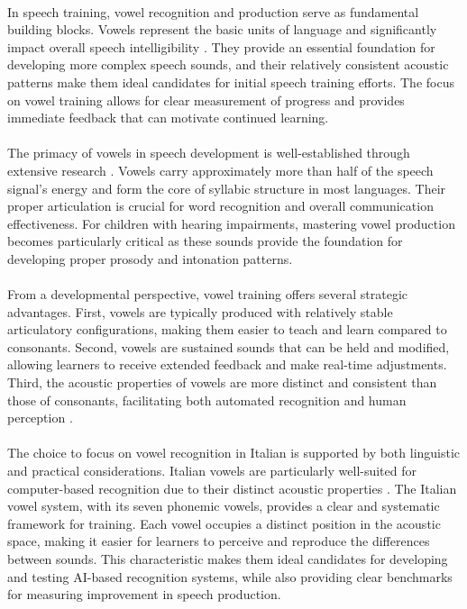 \paragraph{}
In speech training, vowel recognition and production serve as fundamental building blocks. Vowels represent the basic units of language and significantly impact overall speech intelligibility \cite{vowel2020}. They provide an essential foundation for developing more complex speech sounds, and their relatively consistent acoustic patterns make them ideal candidates for initial speech training efforts. The focus on vowel training allows for clear measurement of progress and provides immediate feedback that can motivate continued learning.

\paragraph{}
The primacy of vowels in speech development is well-established through extensive research \cite{speech_methods2023}. Vowels carry approximately more than half of the speech signal's energy and form the core of syllabic structure in most languages. Their proper articulation is crucial for word recognition and overall communication effectiveness. For children with hearing impairments, mastering vowel production becomes particularly critical as these sounds provide the foundation for developing proper prosody and intonation patterns.

\paragraph{}
From a developmental perspective, vowel training offers several strategic advantages. First, vowels are typically produced with relatively stable articulatory configurations, making them easier to teach and learn compared to consonants. Second, vowels are sustained sounds that can be held and modified, allowing learners to receive extended feedback and make real-time adjustments. Third, the acoustic properties of vowels are more distinct and consistent than those of consonants, facilitating both automated recognition and human perception \cite{multimodal2023}.

\paragraph{}
The choice to focus on vowel recognition in Italian is supported by both linguistic and practical considerations. Italian vowels are particularly well-suited for computer-based recognition due to their distinct acoustic properties \cite{italian_phonetics2021}. The Italian vowel system, with its seven phonemic vowels, provides a clear and systematic framework for training. Each vowel occupies a distinct position in the acoustic space, making it easier for learners to perceive and reproduce the differences between sounds. This characteristic makes them ideal candidates for developing and testing AI-based recognition systems, while also providing clear benchmarks for measuring improvement in speech production.

